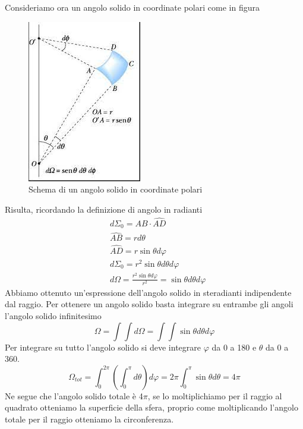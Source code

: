 \documentclass[
10pt, %
a4paper, %
oneside, %
headinclude,footinclude, %
BCOR5mm, %
]{scrartcl}
\begin{document}
Consideriamo ora un angolo solido in coordinate polari come in figura 
\begin{figure}[h!]
	\centering
	\includegraphics[width=0.3\linewidth]{../images/angolo_solido}
	\caption{Schema di un angolo solido in coordinate polari}
	\label{fig:angolosolido}
\end{figure}
\FloatBarrier
Risulta, ricordando la definizione di angolo in radianti
\begin{align*}
	&d\Sigma_0 = \hat{AB}\cdot\hat{AD}\\
	&\hat{AB}=rd\theta\\
	&\hat{AD}=r\sin\theta d\varphi\\
	&d\Sigma_0 = r^2\sin\theta d\theta d\varphi\\
	&d\Omega = \frac{r^2 \sin\theta d\varphi}{r^2} = \sin\theta d\theta d\varphi
\end{align*}
Abbiamo ottenuto un'espressione dell'angolo solido in steradianti indipendente dal raggio. Per ottenere un angolo solido basta integrare su entrambe gli angoli l'angolo solido infinitesimo
\[\Omega = \int\int d\Omega = \int \int \sin\theta d\theta d\varphi\]
Per integrare su tutto l'angolo solido si deve integrare \(\varphi\) da 0 a 180 e $\theta$ da 0 a 360. 
\[\Omega_{tot} = \int^{2\pi}_{0}\left(\int^{\pi}_{0} d\theta\right)d\varphi = 2\pi \int^\pi_{0} \sin\theta d\theta = 4\pi\]
Ne segue che l'angolo solido totale è 4$\pi$, se lo moltiplichiamo per il raggio al quadrato otteniamo la superficie della sfera, proprio come moltiplicando l'angolo totale per il raggio otteniamo la circonferenza.\\\\
\end{document}
